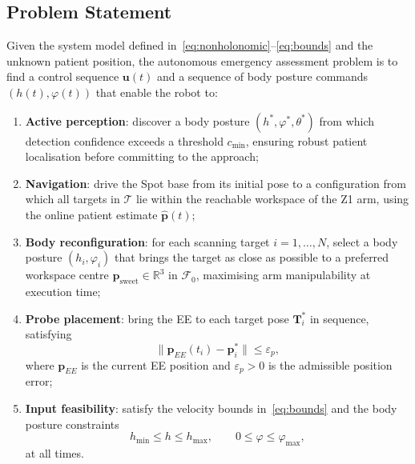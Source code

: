 \subsection{Problem Statement}

Given the system model defined
in~\eqref{eq:nonholonomic}--\eqref{eq:bounds} and the unknown patient
position, the autonomous emergency assessment problem is to find a control
sequence $\mathbf{u}(t)$ and a sequence of body posture commands
$(h(t), \varphi(t))$ that enable the robot to:
\begin{enumerate}
  \item \textbf{Active perception}: discover a body posture
        $(h^*, \varphi^*, \theta^*)$ from which detection confidence
        exceeds a threshold $c_{\min}$, ensuring robust patient
        localisation before committing to the approach;
  \item \textbf{Navigation}: drive the Spot base from its initial pose to a
        configuration from which all targets in $\mathcal{T}$ lie within
        the reachable workspace of the Z1 arm, using the online patient
        estimate $\hat{\mathbf{p}}(t)$;
  \item \textbf{Body reconfiguration}: for each scanning target $i =
        1,\dots,N$, select a body posture $(h_i, \varphi_i)$ that brings
        the target as close as possible to a preferred workspace centre
        $\mathbf{p}_{\mathrm{sweet}} \in \mathbb{R}^3$ in $\mathcal{F}_0$,
        maximising arm manipulability at execution time;
  \item \textbf{Probe placement}: bring the \ac{EE} to each target pose
        $\mathbf{T}_i^*$ in sequence, satisfying
        \begin{equation}
          \|\mathbf{p}_{EE}(t_i) - \mathbf{p}_i^*\| \leq \varepsilon_p,
          \label{eq:task_constraints}
        \end{equation}
        where $\mathbf{p}_{EE}$ is the current \ac{EE} position and
        $\varepsilon_p > 0$ is the admissible position error;
  \item \textbf{Input feasibility}: satisfy the velocity bounds
        in~\eqref{eq:bounds} and the body posture constraints
        \begin{equation}
          h_{\min} \leq h \leq h_{\max}, \qquad
          0 \leq \varphi \leq \varphi_{\max},
          \label{eq:posture_bounds}
        \end{equation}
        at all times.
\end{enumerate}

